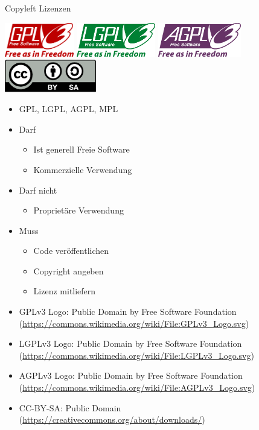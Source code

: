{\begin{frame}{Copyleft Lizenzen}
	\begin{center}
		\includegraphics[height=1.5cm]{res/gpl-v3-logo.pdf}
		\hfill
		\includegraphics[height=1.5cm]{res/lgpl-v3-logo.pdf}
		\hfill
		\includegraphics[height=1.5cm]{res/agpl-v3-logo.pdf}
		\\
		\includegraphics[width=4cm]{res/cc-by-sa.pdf}
	\end{center}
\end{frame}
\note
{
	\begin{itemize}
		\item GPL, LGPL, AGPL, MPL
		\item Darf
		\begin{itemize}
			\item Ist generell Freie Software
			\item Kommerzielle Verwendung
		\end{itemize}
		\item Darf nicht
		\begin{itemize}
			\item Proprietäre Verwendung
		\end{itemize}
		\item Muss
		\begin{itemize}
			\item Code veröffentlichen
			\item Copyright angeben
			\item Lizenz mitliefern
		\end{itemize}
	\end{itemize}
	\begin{itemize}
		\item GPLv3 Logo: Public Domain by Free Software Foundation (\url{https://commons.wikimedia.org/wiki/File:GPLv3\_Logo.svg})
		\item LGPLv3 Logo: Public Domain by Free Software Foundation (\url{https://commons.wikimedia.org/wiki/File:LGPLv3\_Logo.svg})
		\item AGPLv3 Logo: Public Domain by Free Software Foundation (\url{https://commons.wikimedia.org/wiki/File:AGPLv3\_Logo.svg})
		\item CC-BY-SA: Public Domain (\url{https://creativecommons.org/about/downloads/})
	\end{itemize}
}

}

